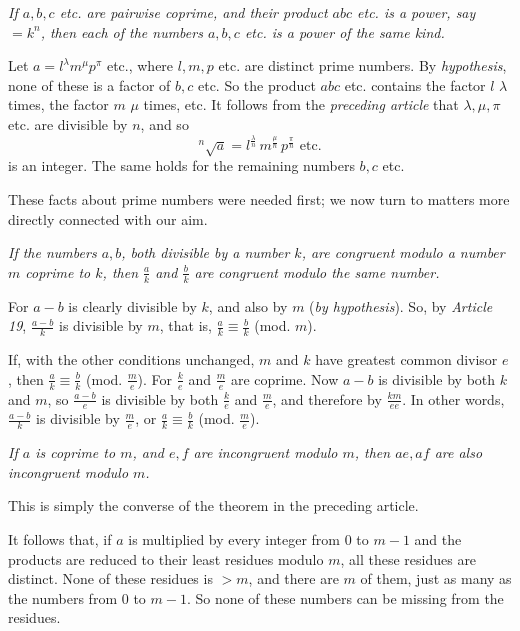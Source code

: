 
\emph{If $a, b, c$ etc. are pairwise coprime, and their product $abc$ etc. is a power, say $=k^n$, then each of the numbers $a, b, c$ etc. is a power of the same kind.}

Let $a = l^\lambda m^\mu p^\pi$ etc., where $l, m, p$ etc. are distinct prime numbers. By \emph{hypothesis}, none of these is a factor of $b, c$ etc. So the product $abc$ etc. contains the factor $l$ $\lambda$ times, the factor $m$ $\mu$ times, etc. It follows from the \emph{preceding article} that $\lambda, \mu, \pi$ etc. are divisible by $n$, and so
\[
{}^{n}\!\surd a = l^{\frac{\lambda}{n}} \, m^{\frac{\mu}{n}} \, p^{\frac{\pi}{n}} \text{ etc.}
\]
is an integer. The same holds for the remaining numbers $b, c$ etc.

These facts about prime numbers were needed first; we now turn to matters more directly connected with our aim.


\emph{If the numbers $a, b$, both divisible by a number $k$, are congruent modulo a number $m$ coprime to $k$, then $\frac{a}{k}$ and $\frac{b}{k}$ are congruent modulo the same number.}

For $a-b$ is clearly divisible by $k$, and also by $m$ (\emph{by hypothesis}). So, by \emph{Article 19}, $\frac{a-b}{k}$ is divisible by $m$, that is, $\frac{a}{k} \equiv \frac{b}{k}$ (mod. $m$).

If, with the other conditions unchanged, $m$ and $k$ have greatest common divisor $e$, then $\frac{a}{k} \equiv \frac{b}{k}$ (mod. $\frac{m}{e}$). For $\frac{k}{e}$ and $\frac{m}{e}$ are coprime. Now $a-b$ is divisible by both $k$ and $m$, so $\frac{a-b}{e}$ is divisible by both $\frac{k}{e}$ and $\frac{m}{e}$, and therefore by $\frac{km}{ee}$. In other words, $\frac{a-b}{k}$ is divisible by $\frac{m}{e}$, or $\frac{a}{k} \equiv \frac{b}{k}$ (mod. $\frac{m}{e}$).


\emph{If $a$ is coprime to $m$, and $e, f$ are incongruent modulo $m$, then $ae, af$ are also incongruent modulo $m$.}

This is simply the converse of the theorem in the preceding article.

It follows that, if $a$ is multiplied by every integer from $0$ to $m-1$ and the products are reduced to their least residues modulo $m$, all these residues are distinct. None of these residues is $> m$, and there are $m$ of them, just as many as the numbers from $0$ to $m-1$. So none of these numbers can be missing from the residues.

